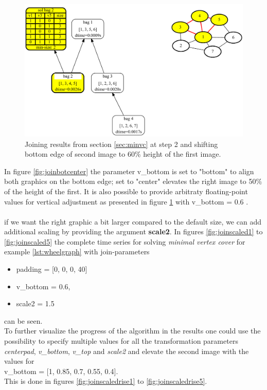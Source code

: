 \documentclass[a4paper, 12pt, bibliography=totoc]{scrartcl}
\begin{document}
\begin{figure}[H]
	\centering
	\includegraphics[width=0.9\linewidth,height=0.9\textheight,keepaspectratio]{images/SVGJOIN/default_062.pdf}
	\caption{Joining results from section \ref{sec:minvc} at step 2 and shifting bottom edge of second image to $60\%$ height of the first image.}
	\label{fig:join60}
\end{figure}

In figure \ref{fig:joinbotcenter} the parameter v\_bottom is set to "bottom" to align both graphics on the bottom edge; set to "center" elevates the right image to 50\% of the height of the first. It is also possible to provide arbitraty floating-point values for vertical adjustment as presented in figure \ref{fig:join60} with v\_bottom = 0.6 .\\
\\
if we want the right graphic a bit larger compared to the default size, we can add additional scaling by providing the argument \textbf{scale2}. In figures \ref{fig:joinscaled1} to \ref{fig:joinscaled5} the complete time series for solving \textit{minimal vertex cover} for example \ref{lst:wheelgraph} with join-parameters
\begin{itemize}
	\item[] padding = [0, 0, 0, 40]
	\item[] v\_bottom = 0.6,
	\item[] scale2 = 1.5
\end{itemize}
can be seen. \\
To further visualize the progress of the algorithm in the results one could use the possibility to specify multiple values for all the transformation parameters \textit{centerpad}, \textit{v\_bottom}, \textit{v\_top} and \textit{scale2} and elevate the second image with the values for\\
 v\_bottom = [1, 0.85, 0.7, 0.55, 0.4]. \\
 This is done in figures \ref{fig:joinscaledrise1} to \ref{fig:joinscaledrise5}.
\end{document}
